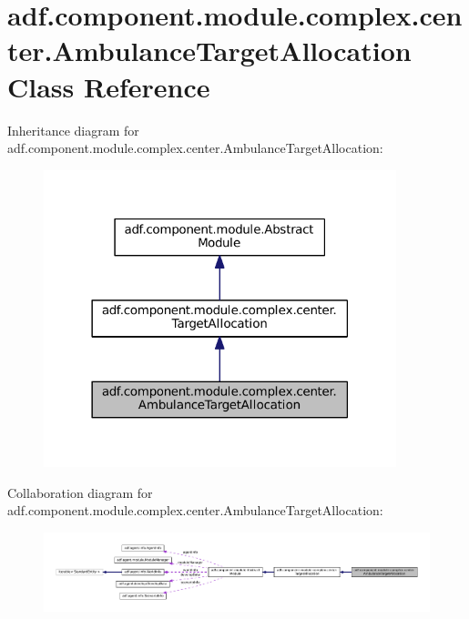 \hypertarget{classadf_1_1component_1_1module_1_1complex_1_1center_1_1AmbulanceTargetAllocation}{}\section{adf.\+component.\+module.\+complex.\+center.\+Ambulance\+Target\+Allocation Class Reference}
\label{classadf_1_1component_1_1module_1_1complex_1_1center_1_1AmbulanceTargetAllocation}


Inheritance diagram for adf.\+component.\+module.\+complex.\+center.\+Ambulance\+Target\+Allocation\+:
\nopagebreak
\begin{figure}[H]
\begin{center}
\leavevmode
\includegraphics[width=290pt]{classadf_1_1component_1_1module_1_1complex_1_1center_1_1AmbulanceTargetAllocation__inherit__graph}
\end{center}
\end{figure}


Collaboration diagram for adf.\+component.\+module.\+complex.\+center.\+Ambulance\+Target\+Allocation\+:
\nopagebreak
\begin{figure}[H]
\begin{center}
\leavevmode
\includegraphics[width=350pt]{classadf_1_1component_1_1module_1_1complex_1_1center_1_1AmbulanceTargetAllocation__coll__graph}
\end{center}
\end{figure}
